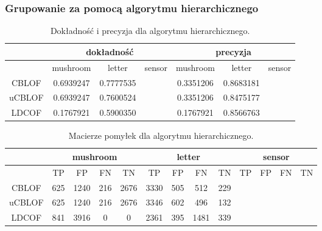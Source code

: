 \documentclass[11pt,a4paper,twoside]{article}
\begin{document}

\subsubsection{Grupowanie za pomocą algorytmu hierarchicznego }

\begin{table}[H]
\centering
\caption{Dokładność i precyzja dla algorytmu hierarchicznego.}
\label{accPrec_v2}
\begin{tabular}{|*{7}{c|}}
\hline
 & \multicolumn{3}{c|}{dokładność} & \multicolumn{3}{c|}{precyzja} \\\hline
 & mushroom & letter & sensor & mushroom & letter & sensor \\\hline
 CBLOF &     0.6939247    &     0.7777535   &       &   0.3351206  &   0.8683181  &       \\\hline
 uCBLOF &  0.6939247   &     0.7600524   &       &   0.3351206  &  0.8475177  &   \\\hline
 LDCOF &    0.1767921      &     0.5900350    &       &  0.1767921   &   0.8566763   &       \\\hline
\end{tabular}
\end{table}


\begin{table}[H]
\centering
\caption{Macierze pomyłek dla algorytmu hierarchicznego.}
\label{confMatrix_v1}
\begin{tabular}{|*{13}{c|}}
\hline
 & \multicolumn{4}{c|}{mushroom} & \multicolumn{4}{c|}{letter} & \multicolumn{4}{c|}{sensor} \\\hline
 & TP & FP & FN & TN  & TP & FP & FN & TN  & TP & FP & FN & TN \\\hline
 CBLOF &     625    &   1240      &   216    &    2676    &    3330   &   505   &   512      &   229   & & & &      \\\hline
 uCBLOF &   625    &   1240      &    216    &    2676   &    3346   &   602   &   496      &   132   & & &   &    \\\hline
 LDCOF &     841    &    3916     &    0       &     0         &    2361   &   395   &   1481    &   339    & & &  &  \\\hline
\end{tabular}
\end{table}
\end{document}
